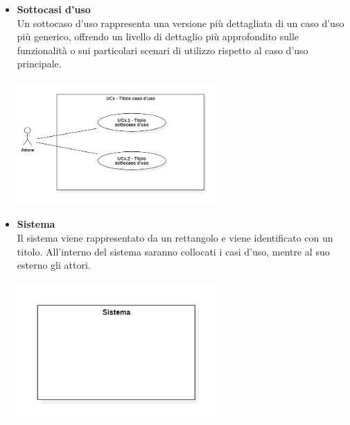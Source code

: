 \begin{itemize}
    \item \textbf{Sottocasi d'uso} \\
    Un sottocaso d'uso rappresenta una versione più dettagliata di un caso d'uso più generico, offrendo un livello di dettaglio più approfondito sulle funzionalità o sui particolari scenari di utilizzo rispetto al caso d'uso principale.
    \begin{minipage}[t]{\linewidth}
        \centering
        \includegraphics[width=0.6\textwidth]{../Images/NormeDiProgetto/SottocasoD'Uso.PNG}
    \end{minipage}

    \item \textbf{Sistema} \\
    Il sistema viene rappresentato da un rettangolo e viene identificato con un titolo. All'interno del sistema saranno collocati i casi d'uso, mentre al suo esterno gli attori.
    \begin{minipage}[t]{\linewidth}
        \centering
        \includegraphics[width=0.6\textwidth]{../Images/NormeDiProgetto/Sistema.PNG}
    \end{minipage}


\end{itemize}
